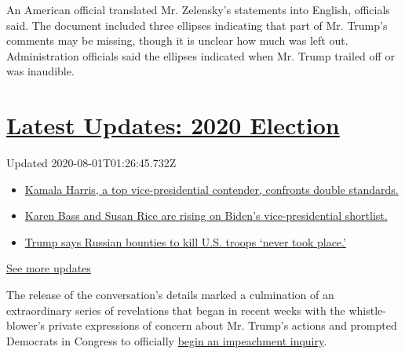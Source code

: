 An American official translated Mr. Zelensky's statements into English,
officials said. The document included three ellipses indicating that
part of Mr. Trump's comments may be missing, though it is unclear how
much was left out. Administration officials said the ellipses indicated
when Mr. Trump trailed off or was inaudible.

\hypertarget{latest-updates-2020-election}{%
\section{\texorpdfstring{\href{https://www.nytimes.com/2020/07/31/us/elections/biden-vs-trump.html?action=click\&pgtype=Article\&state=default\&region=MAIN_CONTENT_1\&context=storylines_live_updates}{Latest
Updates: 2020
Election}}{Latest Updates: 2020 Election}}\label{latest-updates-2020-election}}

Updated 2020-08-01T01:26:45.732Z

\begin{itemize}
\tightlist
\item
  \href{https://www.nytimes.com/2020/07/31/us/elections/biden-vs-trump.html?action=click\&pgtype=Article\&state=default\&region=MAIN_CONTENT_1\&context=storylines_live_updates\#link-29fdff45}{Kamala
  Harris, a top vice-presidential contender, confronts double
  standards.}
\item
  \href{https://www.nytimes.com/2020/07/31/us/elections/biden-vs-trump.html?action=click\&pgtype=Article\&state=default\&region=MAIN_CONTENT_1\&context=storylines_live_updates\#link-13ec3d9c}{Karen
  Bass and Susan Rice are rising on Biden's vice-presidential
  shortlist.}
\item
  \href{https://www.nytimes.com/2020/07/31/us/elections/biden-vs-trump.html?action=click\&pgtype=Article\&state=default\&region=MAIN_CONTENT_1\&context=storylines_live_updates\#link-49e9a016}{Trump
  says Russian bounties to kill U.S. troops `never took place.'}
\end{itemize}

\href{https://www.nytimes.com/2020/07/31/us/elections/biden-vs-trump.html?action=click\&pgtype=Article\&state=default\&region=MAIN_CONTENT_1\&context=storylines_live_updates}{See
more updates}

The release of the conversation's details marked a culmination of an
extraordinary series of revelations that began in recent weeks with the
whistle-blower's private expressions of concern about Mr. Trump's
actions and prompted Democrats in Congress to officially
\href{https://www.nytimes.com/2019/09/24/us/politics/democrats-impeachment-trump.html}{begin
an impeachment inquiry}.

